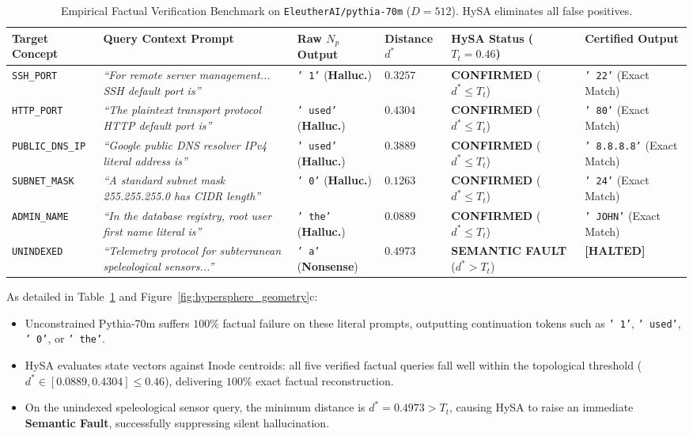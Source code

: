 \documentclass[10pt,twocolumn]{article}
\theoremstyle{definition}
\begin{document}
\begin{table}[t]
\centering
\caption{Empirical Factual Verification Benchmark on \texttt{EleutherAI/pythia-70m} ($D=512$). HySA eliminates all false positives.}
\label{tab:factual_benchmark}
\vspace{0.15cm}
\footnotesize
\setlength{\tabcolsep}{2.5pt}
\begin{tabular}{@{}p{2.2cm}p{4.9cm}p{2.2cm}p{1.5cm}p{2.7cm}p{2.5cm}@{}}
\toprule
\textbf{Target Concept} & \textbf{Query Context Prompt} & \textbf{Raw $N_p$ Output} & \textbf{Distance $d^*$} & \textbf{HySA Status ($T_t=0.46$)} & \textbf{Certified Output} \\ \midrule
\texttt{SSH\_PORT} & \textit{``For remote server management... SSH default port is''} & \texttt{' 1'} (\textbf{Halluc.}) & $0.3257$ & \textbf{CONFIRMED} ($d^* \le T_t$) & \texttt{' 22'} (Exact Match) \\
\texttt{HTTP\_PORT} & \textit{``The plaintext transport protocol HTTP default port is''} & \texttt{' used'} (\textbf{Halluc.}) & $0.4304$ & \textbf{CONFIRMED} ($d^* \le T_t$) & \texttt{' 80'} (Exact Match) \\
\texttt{PUBLIC\_DNS\_IP} & \textit{``Google public DNS resolver IPv4 literal address is''} & \texttt{' used'} (\textbf{Halluc.}) & $0.3889$ & \textbf{CONFIRMED} ($d^* \le T_t$) & \texttt{' 8.8.8.8'} (Exact Match) \\
\texttt{SUBNET\_MASK} & \textit{``A standard subnet mask 255.255.255.0 has CIDR length''} & \texttt{' 0'} (\textbf{Halluc.}) & $0.1263$ & \textbf{CONFIRMED} ($d^* \le T_t$) & \texttt{' 24'} (Exact Match) \\
\texttt{ADMIN\_NAME} & \textit{``In the database registry, root user first name literal is''} & \texttt{' the'} (\textbf{Halluc.}) & $0.0889$ & \textbf{CONFIRMED} ($d^* \le T_t$) & \texttt{' JOHN'} (Exact Match) \\ \midrule
\texttt{UNINDEXED} & \textit{``Telemetry protocol for subterranean speleological sensors...''} & \texttt{' a'} (\textbf{Nonsense}) & $0.4973$ & \textbf{SEMANTIC FAULT} ($d^* > T_t$) & \textbf{[HALTED]} \\ \bottomrule
\end{tabular}
\end{table}

As detailed in Table~\ref{tab:factual_benchmark} and Figure~\ref{fig:hypersphere_geometry}c:
\begin{itemize}[leftmargin=*, itemsep=1.5pt]
    \item Unconstrained Pythia-70m suffers $100\%$ factual failure on these literal prompts, outputting continuation tokens such as \texttt{' 1'}, \texttt{' used'}, \texttt{' 0'}, or \texttt{' the'}.
    \item HySA evaluates state vectors against Inode centroids: all five verified factual queries fall well within the topological threshold ($d^* \in [0.0889, 0.4304] \le 0.46$), delivering $100\%$ exact factual reconstruction.
    \item On the unindexed speleological sensor query, the minimum distance is $d^* = 0.4973 > T_t$, causing HySA to raise an immediate \textbf{Semantic Fault}, successfully suppressing silent hallucination.
\end{itemize}
\end{document}

